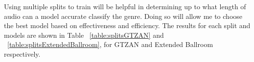 \documentclass[10pt,twocolumn,letterpaper]{article}
\begin{document}
	Using multiple splits to train will be helpful in determining up to what length of audio can a model accurate classify the genre. Doing so will allow me to choose the best model based on effectiveness and efficiency. The results for each split and models are shown in Table ~\ref{table:splitsGTZAN} and ~\ref{table:splitsExtendedBallroom}, for GTZAN and Extended Ballroom respectively.
	
	\begin{table}[!htbp] %
		\caption{Impact of Splits in GTZAN}
		\centering
	\label{table:splitsGTZAN}
	\end{table}
\end{document}
